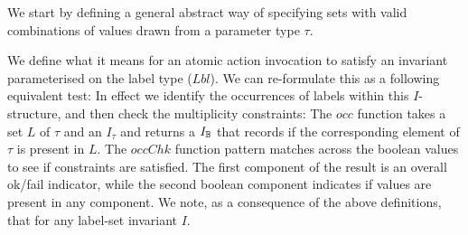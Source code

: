 We start by defining a general abstract way of specifying
sets with valid combinations
of values drawn from a parameter type $\tau$.

We define what it means for an atomic action invocation
to satisfy an invariant parameterised on the label type ($Lbl$).
We can re-formulate this as a following equivalent test:
In effect we identify the occurrences of labels within this $I$-structure,
and then check the multiplicity constraints:
The $occ$ function takes a set $L$ of $\tau$ and an $I_\tau$ and returns a $I_{\mathbb{B}}$
that records if the corresponding element of $\tau$ is present in $L$.
The $occChk$ function pattern matches across the boolean values to see if
constraints are satisfied.
The first component of the result is an overall ok/fail indicator,
while the second boolean component indicates if values are present
in any component.
We note, as a consequence of the above definitions, that
for any label-set invariant $I$.

